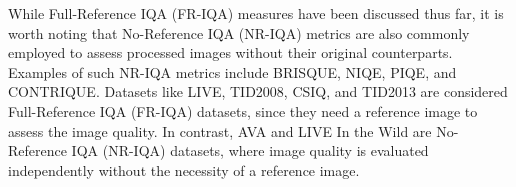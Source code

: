 While Full-Reference IQA (FR-IQA) measures have been discussed thus far, it is worth noting that No-Reference IQA (NR-IQA) metrics are also commonly employed to assess processed images without their original counterparts. Examples of such NR-IQA metrics include BRISQUE, NIQE, PIQE, and CONTRIQUE. Datasets like LIVE, TID2008, CSIQ, and TID2013 are considered Full-Reference IQA (FR-IQA) datasets, since they need a reference image to assess the image quality. In contrast, AVA and LIVE In the Wild are No-Reference IQA (NR-IQA) datasets, where image quality is evaluated independently without the necessity of a reference image.



